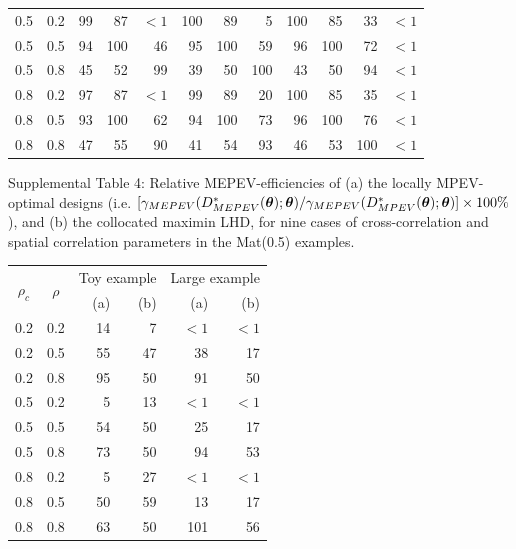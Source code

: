 \documentclass[12pt]{article}
\def\btheta{\mbox{\boldmath$\theta$}}
\begin{document}
{\begin{center}
\begin{tabular}{|cc|rrrrrrrrrr|}
0.5 & 0.2 & 99 & 87 & $<1$ & 100 & 89 & 5 & 100 & 85 & 33         & $<1$ \\
0.5 & 0.5 & 94 & 100 & 46 & 95 & 100 & 59 & 96 & 100 & 72         & $<1$ \\
0.5 & 0.8 & 45 & 52 & 99 & 39 & 50 & 100 & 43 & 50 & 94           & $<1$ \\
0.8 & 0.2 & 97 & 87 & $<1$ & 99 & 89 & 20 & 100 & 85 & 35         & $<1$ \\
0.8 & 0.5 & 93 & 100 & 62 & 94 & 100 & 73 & 96 & 100 & 76         & $<1$ \\
0.8 & 0.8 & 47 & 55 & 90 & 41 & 54 & 93 & 46 & 53 & 100           & $<1$ \\
\hline
\end{tabular}
\end{center}}
\vspace{0.75in}
\noindent
Supplemental Table 4:  Relative MEPEV-efficiencies of (a) the locally MPEV-optimal designs (i.e. $[\gamma_{MEPEV}(D^{*}_{MEPEV}(\btheta);\btheta)/\gamma_{MEPEV}(D^{*}_{MPEV}(\btheta);\btheta)]\times 100\%$), and (b) the collocated maximin LHD, for nine cases of cross-correlation and spatial correlation parameters in the Mat(0.5) examples.
{\footnotesize
\vspace{.05in}
\begin{center}
\begin{tabular}{|cc|rr|rr|}
\hline
\multirow{2}{*}{$\rho_c$}&\multirow{2}{*}{$\rho$} & \multicolumn{2}{c|}{Toy example} & \multicolumn{2}{c|}{Large example} \\%
         &        & (a)         &(b)& (a)           &(b)\\
\hline
0.2 & 0.2 & 14 &7  & $<1$  & $<1$\\
0.2 & 0.5 & 55 &47 & 38    & 17\\
0.2 & 0.8 & 95 &50 & 91    & 50\\
0.5 & 0.2 & 5  &13 & $<1$  & $<1$\\
0.5 & 0.5 & 54 &50 & 25    & 17\\
0.5 & 0.8 & 73 &50 & 94    & 53\\
0.8 & 0.2 & 5  &27 & $<1$  & $<1$\\
0.8 & 0.5 & 50 &59 & 13    & 17\\
0.8 & 0.8 & 63 &50 & 101   & 56\\
\hline
\end{tabular}
\end{center}}
\newpage
\noindent
\end{document}
